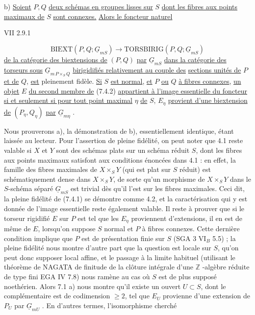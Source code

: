 b) \underline{Soient} $P,Q$ \underline{deux schémas en groupes lisses sur} $S$ \underline{dont les fibres aux points maximaux de} $S$ \underline{sont connexes.} \underline{Alors le foncteur naturel}

VII 2.9.1

\begin{equation}\tag{7.4.2}
\mathrm{BIEXT}(P,Q;\underline{G}_{mS}) \longrightarrow \mathrm{TORSBIRIG}(P,Q;\underline{G}_{mS})
\end{equation}
\underline{de la catégorie des biextensions de} $(P,Q)$ \underline{par} $\underline{G}_{mS}$ \underline{dans la catégorie des torseurs sous} $\underline{G}_{m\,P\times_S Q}$ \underline{birigidifiés relativement au couple des}
\underline{sections unités de} $P$ \underline{et de} $Q$, \underline{est} pleinement fidèle. \underline{Si} $S$ \underline{est normal}, \underline{et} $P$ \underline{ou} $Q$ \underline{à fibres connexes}, \underline{un objet} $E$ \underline{du second membre de} (7.4.2) \underline{appartient à l'image essentielle du foncteur si et seulement si pour tout point maximal} $\eta$ \underline{de} $S$, $E_{\eta}$ \underline{provient d'une biextension de} $(P_{\eta},Q_{\eta})$ \underline{par} $\underline{G}_{m\eta}$ .

Nous prouverons a), la démonstration de b), essentiellement identique, étant laissée au lecteur. Pour l'assertion de pleine fidélité, on peut noter que 4.1 reste valable si $X$ et $Y$ sont des schémas plats sur un schéma réduit $S$, dont les fibres aux points maximaux satisfont aux conditions énoncées dans 4.1 : en effet, la famille des fibres maximales de $X\times_S Y$ (qui est plat sur $S$ réduit) est schématiquement dense dans $X\times_S Y$, de sorte qu'un morphisme de $X\times_S Y$ dans le $S$-schéma séparé $\underline{G}_{mS}$ est trivial dès qu'il l'est sur les fibres maximales. Ceci dit, la pleine fidélité de (7.4.1) se démontre comme 4.2, et la caractérisation qui y est donnée de l'image essentielle reste également valable. Il reste à prouver que si le torseur rigidifié $E$ sur $P$ est tel que les $E_{\eta}$ proviennent d'extensions, il en est de même de $E$, lorsqu'on suppose $S$ normal et $P$ à fibres connexes. Cette dernière condition implique que $P$ est de présentation finie sur $S$ (SGA 3 $\mathrm{VI}_B$ 5.5) ; la pleine fidélité nous montre d'autre part que la question est locale sur $S$, qu'on peut donc supposer local affine, et le passage à la limite habituel (utilisant le théorème de NAGATA de finitude de la clôture intégrale d'une $\mathbb{Z}$ -algèbre réduite de type fini EGA IV 7.8) nous ramène au cas où $S$ est de plus supposé noethérien. Alors 7.1 a) nous montre qu'il existe un ouvert $U \subset S$, dont le complémentaire est de codimension $\geq 2$, tel que $E_U$ provienne d'une
extension de $P_U$ par $\underline{G}_{mU}$ . En d'autres termes, l'isomorphisme cherché

